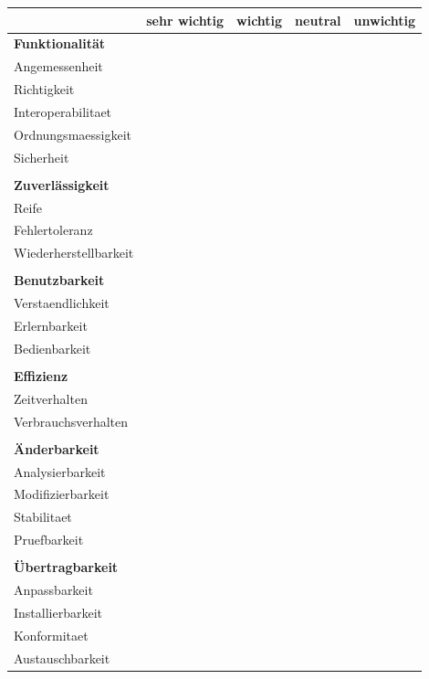 \documentclass{article}
\newcommand{\xmark}{\ding{55}}
\begin{document}
\begin{table}[H]
  \begin{tabular}{| l | c | c | c | c |}
    \hline
     & \textbf{sehr wichtig} & \textbf{wichtig} & \textbf{neutral} & \textbf{unwichtig} \\ \hline
    \textbf{Funktionalität} &  &  &  & \\ \hline
    \gls{Angemessenheit} &  &  & \xmark & \\ \hline
    \gls{Richtigkeit} &  & \xmark &  & \\ \hline
    \gls{Interoperabilitaet} &  &  &  & \xmark \\ \hline
    \gls{Ordnungsmaessigkeit} &  &  & \xmark & \\ \hline
    \gls{Sicherheit} &  &  & \xmark & \\ \hline
     &  &  &  & \\ \hline
    \textbf{Zuverlässigkeit} &  &  &  & \\ \hline
    \gls{Reife} & & \xmark &  & \\ \hline
    \gls{Fehlertoleranz} & & \xmark &  & \\ \hline
    \gls{Wiederherstellbarkeit} &  &  & \xmark & \\ \hline
     &  &  &  & \\ \hline
    \textbf{Benutzbarkeit} &  &  &  & \\ \hline
    \gls{Verstaendlichkeit} & \xmark &  &  & \\ \hline
    \gls{Erlernbarkeit} & \xmark &  &  & \\ \hline
    \gls{Bedienbarkeit} & \xmark &  &  & \\ \hline
     &  &  &  & \\ \hline
    \textbf{Effizienz} &  &  &  & \\ \hline
    \gls{Zeitverhalten} &  &  & \xmark & \\ \hline
    \gls{Verbrauchsverhalten} &  &  & \xmark & \\ \hline
     &  &  &  & \\ \hline
    \textbf{Änderbarkeit} &  &  & \xmark & \\ \hline
    \gls{Analysierbarkeit} &  &  &  & \\ \hline
    \gls{Modifizierbarkeit} &  & \xmark &  & \\ \hline
    \gls{Stabilitaet} &  &  & \xmark & \\ \hline
    \gls{Pruefbarkeit} &  &  & \xmark & \\ \hline
     &  &  &  & \\ \hline
    \textbf{Übertragbarkeit} &  &  &  & \\ \hline
    \gls{Anpassbarkeit} &  &  & \xmark & \\ \hline
    \gls{Installierbarkeit} &  &  & \xmark & \\ \hline
    \gls{Konformitaet} &  &  & \xmark & \\ \hline
    \gls{Austauschbarkeit} &  &  & \xmark & \\ \hline
    \end{tabular}
\end{table}
\end{document}
